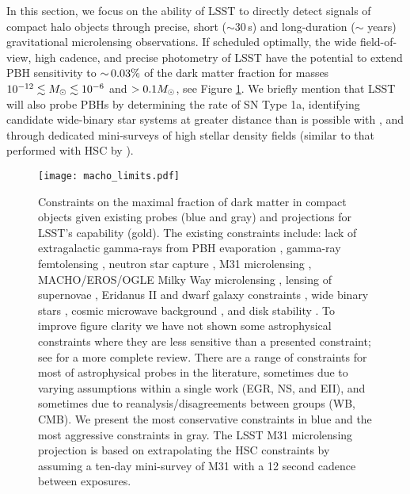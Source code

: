 In this section, we focus on the ability of LSST to directly detect signals of compact halo objects through precise, short ($\sim30\,$s) and long-duration ($\sim$ years) gravitational microlensing observations.
If scheduled optimally, the wide field-of-view, high cadence, and precise photometry of LSST have the potential to extend PBH sensitivity to $ {\sim}\, 0.03\%$ of the dark matter fraction for masses $10^{-12}\lesssim M_\odot \lesssim 10^{-6}$ and $>0.1M_\odot$, see Figure \ref{fig:macho_constraints}.
We briefly mention that LSST will also probe PBHs by determining the rate of SN Type 1a, identifying candidate wide-binary star systems at greater distance than is possible with \Gaia, and through dedicated mini-surveys of high stellar density fields (similar to that performed with HSC by \citealt{1701.02151}).

\begin{figure}[t]
\label{fig:macho_constraints}
\centering
\texttt{[image: macho\_limits.pdf]}
\caption{
    Constraints on the maximal fraction of dark matter in compact objects given existing probes (blue and gray) and projections for LSST's capability (gold).
    The existing constraints include: lack of extragalactic gamma-rays from PBH evaporation \citep[EGR][]{PhysRevD.81.104019, PhysRevD.94.044029}, gamma-ray femtolensing \citep[GF][]{PhysRevD.86.043001}, neutron star capture \citep[NS][]{PhysRevD.87.123524}, M31 microlensing \citep[M31ML][]{2017arXiv170102151N}, MACHO/EROS/OGLE Milky Way microlensing \citep[MWML][]{10.1051/0004-6361:20066017, 2001ApJ...550L.169A, 2009MNRAS.397.1228W}, lensing of supernovae \citep[LSN][]{PhysRevLett.121.141101, arxiv:1712.06574v1}, Eridanus II and dwarf galaxy constraints \citep[EII][]{2016ApJ...824L..31B, arxiv:1611.05052v2}, wide binary stars \citep[WB][]{2009MNRAS.396L..11Q, 2004ApJ...601..311Y}, cosmic microwave background \citep[CMB][]{2017PhRvD..95d3534A, 2008ApJ...680..829R}, and disk stability \citep[DS][]{1985ApJ...299..633L, 1994ApJ...437..184X}.
    To improve figure clarity we have not shown some astrophysical constraints where they are less sensitive than a presented constraint; see \citet{2016PhRvD..94h3504C} for a more complete review.
    There are a range of constraints for most of astrophysical probes in the literature, sometimes due to varying assumptions within a single work (EGR, NS, and EII), and sometimes due to reanalysis/disagreements between groups (WB, CMB).
    We present the most conservative constraints in blue and the most aggressive constraints in gray.
    The LSST M31 microlensing projection is based on extrapolating the HSC constraints \citet{2017arXiv170102151N} by assuming a ten-day mini-survey of M31 with a 12 second cadence between exposures.
}
\end{figure}
